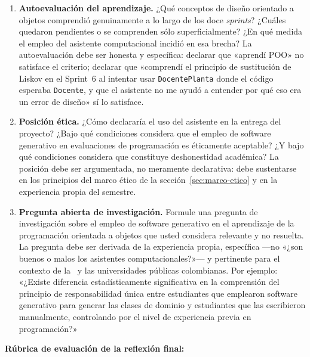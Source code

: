 \begin{tcolorbox}[actividadIA,
  title={Actividad final de reflexión (Sprint~12) ---
         Software generativo y aprendizaje de la \poo}]
\begin{enumerate}[label=\textbf{\arabic*.}]
  \item \textbf{Autoevaluación del aprendizaje.}
        ¿Qué conceptos de diseño orientado a objetos comprendió genuinamente
        a lo largo de los doce \textit{sprints}? ¿Cuáles quedaron pendientes
        o se comprenden sólo superficialmente? ¿En qué medida el empleo del
        asistente computacional incidió en esa brecha? La autoevaluación debe
        ser honesta y específica: declarar que «aprendí POO» no satisface el
        criterio; declarar que «comprendí el principio de sustitución de Liskov
        en el Sprint~6 al intentar usar \texttt{DocentePlanta} donde el código
        esperaba \texttt{Docente}, y que el asistente no me ayudó a entender
        por qué eso era un error de diseño» sí lo satisface.

  \item \textbf{Posición ética.}
        ¿Cómo declararía el uso del asistente en la entrega del proyecto?
        ¿Bajo qué condiciones considera que el empleo de software generativo
        en evaluaciones de programación es éticamente aceptable? ¿Y bajo qué
        condiciones considera que constituye deshonestidad académica? La
        posición debe ser argumentada, no meramente declarativa: debe
        sustentarse en los principios del marco ético de la
        sección~\ref{sec:marco-etico} y en la experiencia propia del semestre.

  \item \textbf{Pregunta abierta de investigación.}
        Formule una pregunta de investigación sobre el empleo de software
        generativo en el aprendizaje de la programación orientada a objetos
        que usted considera relevante y no resuelta. La pregunta debe ser
        derivada de la experiencia propia, específica ---no «¿son buenos o malos
        los asistentes computacionales?»--- y pertinente para el contexto de la \ud\
        y las universidades públicas colombianas. Por ejemplo: «¿Existe
        diferencia estadísticamente significativa en la comprensión del
        principio de responsabilidad única entre estudiantes que emplearon
        software generativo para generar las clases de dominio y estudiantes
        que las escribieron manualmente, controlando por el nivel de experiencia
        previa en programación?»
\end{enumerate}

\bigskip
\textbf{Rúbrica de evaluación de la reflexión final:}


\end{tcolorbox}
